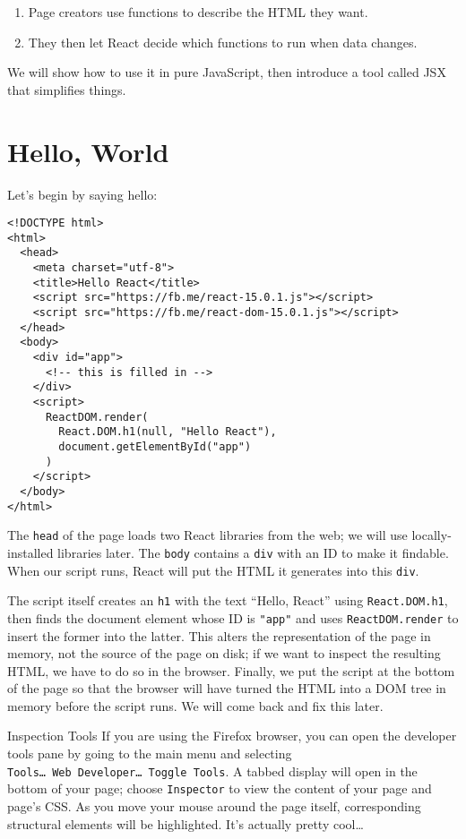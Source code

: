 \begin{enumerate}
\item
  Page creators use functions to describe the HTML they want.
\item
  They then let React decide which functions to run when data changes.
\end{enumerate}

We will show how to use it in pure JavaScript,
then introduce a tool called JSX that simplifies things.

\section{Hello, World}\label{s:dynamic-hello}

Let's begin by saying hello:

\begin{verbatim}
<!DOCTYPE html>
<html>
  <head>
    <meta charset="utf-8">
    <title>Hello React</title>
    <script src="https://fb.me/react-15.0.1.js"></script>
    <script src="https://fb.me/react-dom-15.0.1.js"></script>
  </head>
  <body>
    <div id="app">
      <!-- this is filled in -->
    </div>
    <script>
      ReactDOM.render(
        React.DOM.h1(null, "Hello React"),
        document.getElementById("app")
      )
    </script>
  </body>
</html>
\end{verbatim}

The \texttt{head} of the page loads two React libraries from the web;
we will use locally-installed libraries later.
The \texttt{body} contains a \texttt{div} with an ID to make it findable.
When our script runs,
React will put the HTML it generates into this \texttt{div}.

The script itself creates an \texttt{h1} with the text ``Hello, React'' using \texttt{React.DOM.h1},
then finds the document element whose ID is \texttt{"app"}
and uses \texttt{ReactDOM.render} to insert the former into the latter.
This alters the representation of the page in memory,
not the source of the page on disk;
if we want to inspect the resulting HTML,
we have to do so in the browser.
Finally,
we put the script at the bottom of the page
so that the browser will have turned the HTML into a DOM tree in memory
before the script runs.
We will come back and fix this later.

\begin{aside}{Inspection Tools}
  If you are using the Firefox browser,
  you can open the developer tools pane by going to the main menu
  and selecting \texttt{Tools{\ldots}\ Web\ Developer{\ldots}\ Toggle\ Tools}.
  A tabbed display will open in the bottom of your page;
  choose \texttt{Inspector} to view the content of your page and page's CSS.
  As you move your mouse around the page itself,
  corresponding structural elements will be highlighted.
  It's actually pretty cool{\ldots}
\end{aside}

